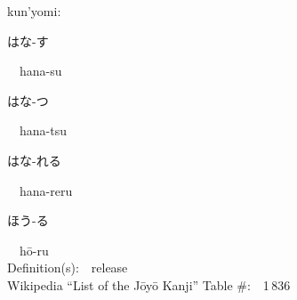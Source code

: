 \begin{multicols}{2}
{\hspace*{1em}}kun'yomi:\ \ \\
{\hspace*{2em}}{\begin{CJK}{UTF8}{min} はな-す \end{CJK}}\ \ hana-su\ \ \\
{\hspace*{2em}}{\begin{CJK}{UTF8}{min} はな-つ \end{CJK}}\ \ hana-tsu\ \ \\
{\hspace*{2em}}{\begin{CJK}{UTF8}{min} はな-れる \end{CJK}}\ \ hana-reru\ \ \\
{\hspace*{2em}}{\begin{CJK}{UTF8}{min} ほう-る \end{CJK}}\ \ h\=o-ru\ \ \\
Definition(s):\ \ release \\
Wikipedia ``List of the J\=oy\=o Kanji'' Table \#:\ \ 1\,836 \\
\ \ \\
\end{multicols}



